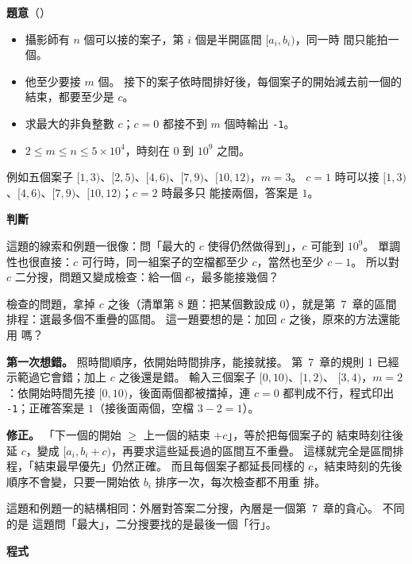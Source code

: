 \textbf{題意}（）

\begin{itemize}
\item 攝影師有 $n$ 個可以接的案子，第 $i$ 個是半開區間 $[a_i, b_i)$，同一時
間只能拍一個。
\item 他至少要接 $m$ 個。 接下的案子依時間排好後，每個案子的開始減去前一個的
結束，都要至少是 $c$。
\item 求最大的非負整數 $c$；$c = 0$ 都接不到 $m$ 個時輸出 \texttt{-1}。
\item $2 \le m \le n \le 5 \times 10^4$，時刻在 $0$ 到 $10^9$ 之間。
\end{itemize}

例如五個案子 $[1, 3)$、$[2, 5)$、$[4, 6)$、$[7, 9)$、$[10, 12)$，$m = 3$。
$c = 1$ 時可以接 $[1, 3)$、$[4, 6)$、$[7, 9)$、$[10, 12)$；$c = 2$ 時最多只
能接兩個，答案是 $1$。

\textbf{判斷}

這題的線索和例題一很像：問「最大的 $c$ 使得仍然做得到」，$c$ 可能到 $10^9$。
單調性也很直接：$c$ 可行時，同一組案子的空檔都至少 $c$，當然也至少
$c - 1$。 所以對 $c$ 二分搜，問題又變成檢查：給一個 $c$，最多能接幾個？

檢查的問題，拿掉 $c$ 之後（清單第 8 題：把某個數設成 $0$），就是第~7~章的區間
排程：選最多個不重疊的區間。 這一題要想的是：加回 $c$ 之後，原來的方法還能用
嗎？

\textbf{第一次想錯。} 照時間順序，依開始時間排序，能接就接。 第~7~章的規則 1
已經示範過它會錯；加上 $c$ 之後還是錯。 輸入三個案子 $[0, 10)$、$[1, 2)$、
$[3, 4)$，$m = 2$：依開始時間先接 $[0, 10)$，後面兩個都被擋掉，連 $c = 0$
都判成不行，程式印出 \texttt{-1}；正確答案是 $1$（接後面兩個，空檔 $3 - 2 = 1$）。

\textbf{修正。} 「下一個的開始 $\ge$ 上一個的結束 $+ c$」，等於把每個案子的
結束時刻往後延 $c$，變成 $[a_i, b_i + c)$，再要求這些延長過的區間互不重疊。
這樣就完全是區間排程，「結束最早優先」仍然正確。 而且每個案子都延長同樣的
$c$，結束時刻的先後順序不會變，只要一開始依 $b_i$ 排序一次，每次檢查都不用重
排。

這題和例題一的結構相同：外層對答案二分搜，內層是一個第~7~章的貪心。 不同的是
這題問「最大」，二分搜要找的是最後一個「行」。

\textbf{程式}

